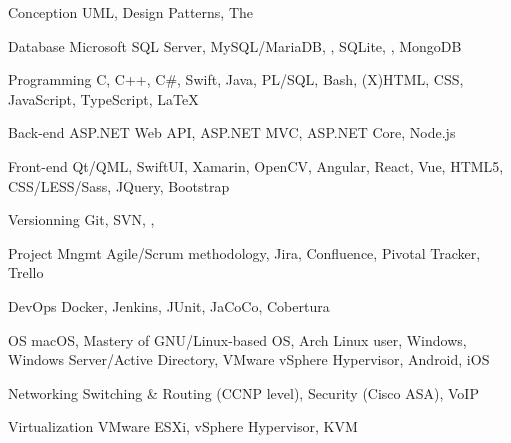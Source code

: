 




\begin{cvskills}

  \cvskill
    {Conception} %
    {UML, Design Patterns, The } %

  \cvskill
    {Database} %
    {Microsoft SQL Server, MySQL/MariaDB, , SQLite, , MongoDB} %

  \cvskill
    {Programming} %
    {C, C++, C\#, Swift, Java, PL/SQL, Bash, (X)HTML, CSS, JavaScript, TypeScript, \LaTeX} %

  \cvskill
    {Back-end} %
    {ASP.NET Web API, ASP.NET MVC, ASP.NET Core, Node.js} %

  \cvskill
    {Front-end} %
    {Qt/QML, SwiftUI, Xamarin, OpenCV, Angular, React, Vue, HTML5, CSS/LESS/Sass, JQuery, Bootstrap} %

  \cvskill
    {Versionning} %
    {Git, SVN, , } %

  \cvskill
    {Project Mngmt} %
    {Agile/Scrum methodology, Jira, Confluence, Pivotal Tracker, Trello} %

  \cvskill
    {DevOps} %
    {Docker, Jenkins, JUnit, JaCoCo, Cobertura} %

  \cvskill
    {OS} %
    {macOS, Mastery of GNU/Linux-based OS, Arch Linux user, Windows, Windows Server/Active Directory, VMware vSphere Hypervisor, Android, iOS} %

  \cvskill
    {Networking} %
    {Switching \& Routing (CCNP level), Security (Cisco ASA), VoIP} %

  \cvskill
    {Virtualization} %
    {VMware ESXi, vSphere Hypervisor, KVM} %


\end{cvskills}

